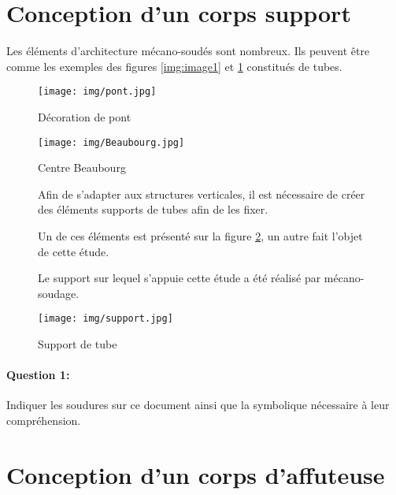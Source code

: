 

\section{Conception d'un corps support}

Les éléments d'architecture mécano-soudés sont nombreux. Ils peuvent être comme les exemples des figures \ref{img:image1} et \ref{img:image2} constitués de tubes.

\begin{figure}[!h]
 \begin{minipage}{0.45\linewidth}
  \centering\texttt{[image: img/pont.jpg]}
  \caption{Décoration de pont}
  \label{img:image1}
\end{minipage}
\hfill
 \begin{minipage}{0.5\linewidth}
  \centering\texttt{[image: img/Beaubourg.jpg]}
  \caption{Centre Beaubourg}
  \label{img:image2}
 \end{minipage}
\end{figure}

\begin{figure}[!h]
 \begin{minipage}{0.58\linewidth}
Afin de s'adapter aux structures verticales, il est nécessaire de créer des éléments supports de tubes afin de les fixer.

Un de ces éléments est présenté sur la figure \ref{img:image3}, un autre fait l'objet de cette étude.

Le support sur lequel s'appuie cette étude a été réalisé par mécano-soudage.
\end{minipage}
\hfill
 \begin{minipage}{0.4\linewidth}
  \centering\texttt{[image: img/support.jpg]}
  \caption{Support de tube}
  \label{img:image3}
 \end{minipage}
\end{figure}

\paragraph{Question 1:} Indiquer les soudures sur ce document ainsi que la symbolique nécessaire à leur compréhension.



\section{Conception d'un corps d'affuteuse}

